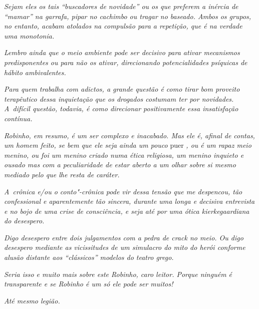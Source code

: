 \emph{Sejam eles os tais ``buscadores de novidade'' ou os que preferem a
inércia de ``mamar'' na garrafa, pipar no cachimbo ou tragar no baseado.
Ambos os grupos, no entanto, acabam atolados na compulsão para a
repetição, que é na verdade uma monotonia.}

\emph{Lembro ainda que o meio ambiente pode ser decisivo para ativar
mecanismos predisponentes ou para não os ativar, direcionando
potencialidades psíquicas de hábito ambivalentes.}

\emph{Para quem trabalha com adictos, a grande questão é como tirar bom
proveito terapêutico dessa inquietação que os drogados costumam ter por
novidades. A~difícil questão, todavia, é como direcionar positivamente
essa insatisfação contínua.}

\emph{Robinho, em resumo, é um ser complexo e inacabado. Mas ele é,
afinal de contas, um homem feito, se bem que ele seja ainda um pouco} 
puer \emph{, ou é um rapaz meio menino, ou foi um menino criado numa ética
religiosa, um menino inquieto e ousado mas com a peculiaridade de estar
aberto a um olhar sobre si mesmo mediado pelo que lhe resta de
caráter.}

\emph{A~crônica e/ou o conto"-crônica pode vir dessa tensão que me
despencou, tão confessional e aparentemente tão sincera, durante uma
longa e decisiva entrevista e no bojo de uma crise de consciência, e
seja até por uma ótica kierkegaardiana do desespero.}

\emph{Digo desespero entre dois julgamentos com a pedra de crack no
meio. Ou digo desespero mediante as vicissitudes de um simulacro do mito
do herói conforme alusão distante aos ``clássicos'' modelos do teatro
grego.}

\emph{Seria isso e muito mais sobre este Robinho, caro leitor. Porque
ninguém é transparente e se Robinho é um só ele pode ser muitos!}

\emph{Até mesmo legião.~}
\endgroup
 

 

 
